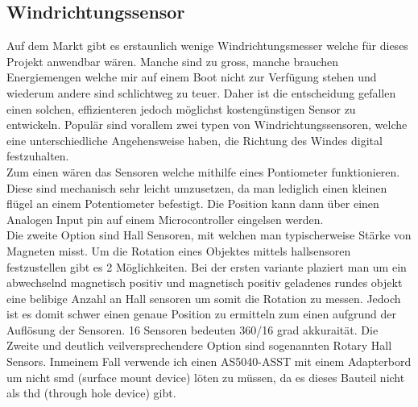 \subsection{Windrichtungssensor}
Auf dem Markt gibt es erstaunlich wenige Windrichtungsmesser welche für dieses Projekt anwendbar wären. Manche sind zu gross, manche brauchen Energiemengen welche mir auf einem Boot nicht zur Verfügung stehen und wiederum andere sind schlichtweg zu teuer. Daher ist die entscheidung gefallen einen solchen, effizienteren jedoch möglichst kostengünstigen Sensor zu entwickeln.
Populär sind vorallem zwei typen von Windrichtungssensoren, welche eine unterschiedliche Angehensweise haben, die Richtung des Windes digital festzuhalten. \\
Zum einen wären das Sensoren welche mithilfe eines Pontiometer funktionieren. Diese sind mechanisch sehr leicht umzusetzen, da man lediglich einen kleinen flügel an einem Potentiometer befestigt. Die Position kann dann über einen Analogen Input pin auf einem Microcontroller eingelsen werden.
\\
Die zweite Option sind Hall Sensoren, mit welchen man typischerweise Stärke von Magneten misst. Um die Rotation eines Objektes mittels hallsensoren festzustellen gibt es 2 Möglichkeiten. Bei der ersten variante plaziert man um ein abwechselnd magnetisch positiv und magnetisch positiv geladenes rundes objekt eine belibige Anzahl an Hall sensoren um somit die Rotation zu messen. Jedoch ist es domit schwer einen genaue Position zu ermitteln zum einen aufgrund der Auflösung der Sensoren. 16 Sensoren bedeuten 360/16 grad akkuraität.  Die Zweite und deutlich veilversprechendere Option sind sogenannten Rotary Hall Sensors. Inmeinem Fall verwende ich einen AS5040-ASST mit einem Adapterbord um nicht smd (surface mount device) löten zu müssen, da es dieses Bauteil nicht als thd (through hole device) gibt. 

